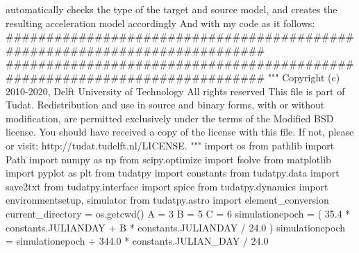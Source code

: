 automatically checks the type of the target and source model, and creates the resulting acceleration model accordingly And with my code as it follows:\markdownRendererInterblockSeparator
{}###########################################################################\markdownRendererInterblockSeparator
{}
\markdownRendererSectionEnd 
\markdownRendererSectionEnd \markdownRendererSectionBegin
\markdownRendererHeadingOne{}\markdownRendererInterblockSeparator
{}
\markdownRendererSectionEnd \markdownRendererSectionBegin
{}\markdownRendererInterblockSeparator
{}
\markdownRendererSectionEnd \markdownRendererSectionBegin
\markdownRendererHeadingOne{}\markdownRendererInterblockSeparator
{}
\markdownRendererSectionEnd \markdownRendererSectionBegin
{}\markdownRendererInterblockSeparator
{}
\markdownRendererSectionEnd \markdownRendererSectionBegin
\markdownRendererHeadingOne{}\markdownRendererInterblockSeparator
{}########################################################################### """ Copyright (c) 2010-2020, Delft University of Technology All rights reserved This file is part of Tudat. Redistribution and use in source and binary forms, with or without modification, are permitted exclusively under the terms of the Modified BSD license. You should have received a copy of the license with this file. If not, please or visit: http://tudat.tudelft.nl/LICENSE. """ import os from pathlib import Path import numpy as np from scipy.optimize import fsolve from matplotlib import pyplot as plt from tudatpy import constants from tudatpy.data import save2txt from tudatpy.interface import spice from tudatpy.dynamics import environmentsetup, simulator from tudatpy.astro import element_conversion\markdownRendererInterblockSeparator
{}
\markdownRendererSectionEnd \markdownRendererSectionBegin
{}\markdownRendererInterblockSeparator
{}current_directory = os.getcwd()\markdownRendererInterblockSeparator
{}
\markdownRendererSectionEnd \markdownRendererSectionBegin
{}\markdownRendererInterblockSeparator
{}A = 3 B = 5 C = 6 simulationepoch = ( 35.4 * constants.JULIANDAY + B * constants.JULIANDAY / 24.0 ) simulationepoch = simulationepoch + 344.0 * constants.JULIAN_DAY / 24.0\markdownRendererInterblockSeparator
